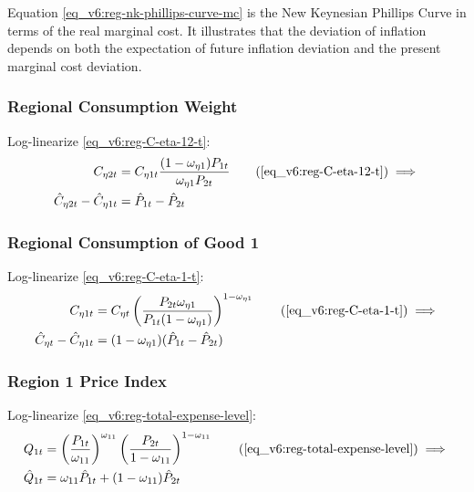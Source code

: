 \documentclass[../thesis.tex]{subfiles}
\begin{document}
Equation \ref{eq_v6:reg-nk-phillips-curve-mc} is the New Keynesian Phillips Curve in terms of the real marginal cost. It illustrates that the deviation of inflation depends on both the expectation of future inflation deviation and the present marginal cost deviation.


\subsubsection*{Regional Consumption Weight}

Log-linearize \ref{eq_v6:reg-C-eta-12-t}:
\begin{align}
	C_{\eta 2 t} &= C_{\eta 1 t} \frac{(1 - \omega_{\eta 1}) P_{1t}}{\omega_{\eta 1} P_{2t}} \tag{\ref{eq_v6:reg-C-eta-12-t}} \implies \\
	\hat{C}_{\eta 2t} - \hat{C}_{\eta 1t} &= \hat{P}_{1t} - \hat{P}_{2t} \label{eq_v6:reg-C-eta-12-t-ll}
\end{align}

\subsubsection*{Regional Consumption of Good 1}

Log-linearize \ref{eq_v6:reg-C-eta-1-t}:
\begin{align}
	C_{\eta 1 t} &= C_{\eta t} \left( \frac{P_{2t} \omega_{\eta 1}}{P_{1t} (1 - \omega_{\eta 1})} \right)^{1-\omega_{\eta 1}} \tag{\ref{eq_v6:reg-C-eta-1-t}} \implies \\
	\hat{C}_{\eta t} - \hat{C}_{\eta 1 t} &= (1 - \omega_{\eta 1}) (\hat{P}_{1t} - \hat{P}_{2t}) \label{eq_v6:reg-C-eta-1-t-ll}
\end{align}

\subsubsection*{Region 1 Price Index}

Log-linearize \ref{eq_v6:reg-total-expense-level}:
\begin{align}
	Q_{1t} &= \left( \frac{P_{1 t}}{\omega_{11}} \right)^{\omega_{11}} \left( \frac{P_{2 t}}{1 -\omega_{11}} \right)^{1 -\omega_{11}} \tag{\ref{eq_v6:reg-total-expense-level}} \implies \\
	\hat{Q}_{1t} &= \omega_{11} \hat{P}_{1 t} + (1 -\omega_{11}) \hat{P}_{2 t} \label{eq_v6:reg-total-expense-level-ll}
\end{align}
\end{document}
